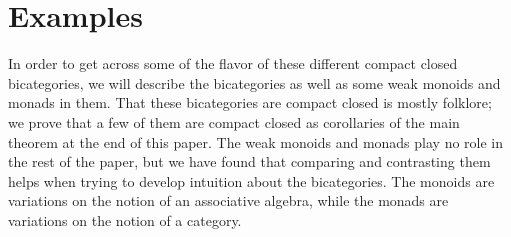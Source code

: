 \documentclass{article}
\begin{document}
\section{Examples}
\label{examples}

In order to get across some of the flavor of these different compact closed bicategories, we will describe the bicategories as well as some weak monoids and monads in them.  That these bicategories are compact closed is mostly folklore; we prove that a few of them are compact closed as corollaries of the main theorem at the end of this paper.  The weak monoids and monads play no role in the rest of the paper, but we have found that comparing and contrasting them helps when trying to develop intuition about the bicategories.  The monoids are variations on the notion of an associative algebra, while the monads are variations on the notion of a category.
\end{document}
